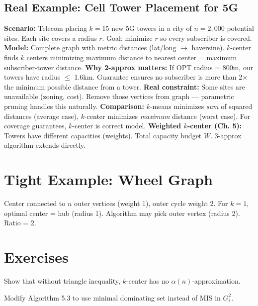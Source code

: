 \subsection*{Real Example: Cell Tower Placement for 5G}
\textbf{Scenario:} Telecom placing $k=15$ new 5G towers in a city of $n=2,000$ potential sites. Each site covers a radius $r$. Goal: minimize $r$ so every subscriber is covered.
\textbf{Model:} Complete graph with metric distances (lat/long $\to$ haversine). $k$-center finds $k$ centers minimizing maximum distance to nearest center = maximum subscriber-tower distance.
\textbf{Why 2-approx matters:} If OPT radius = 800m, our towers have radius $\leq$ 1.6km. Guarantee ensures no subscriber is more than 2$\times$ the minimum possible distance from a tower.
\textbf{Real constraint:} Some sites are unavailable (zoning, cost). Remove those vertices from graph — parametric pruning handles this naturally.
\textbf{Comparison:} $k$-means minimizes \emph{sum} of squared distances (average case), $k$-center minimizes \emph{maximum} distance (worst case). For coverage guarantees, $k$-center is correct model.
\textbf{Weighted $k$-center (Ch. 5):} Towers have different capacities (weights). Total capacity budget $W$. 3-approx algorithm extends directly.

\section{Tight Example: Wheel Graph}
Center connected to $n$ outer vertices (weight 1), outer cycle weight 2. For $k=1$, optimal center = hub (radius 1). Algorithm may pick outer vertex (radius 2). Ratio = 2.

\section{Exercises}
\begin{exercise}
Show that without triangle inequality, $k$-center has no $\alpha(n)$-approximation.
\end{exercise}
\begin{exercise}
Modify Algorithm 5.3 to use minimal dominating set instead of MIS in $G_i^2$.
\end{exercise}

